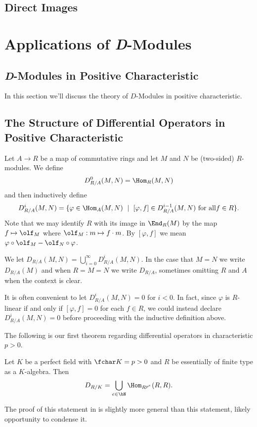 \subsection{Direct Images}

\section{Applications of \textit{D}-Modules}


\subsection{\emph{D}-Modules in Positive Characteristic}
In this section we'll discuss the theory of $D$-Modules in positive characteristic. 
\subsection{The Structure of Differential Operators in Positive Characteristic}

\begin{defn}\label{defn:diff-op-rings}
	Let $A\to R$ be a map of commutative rings and let $M$ and $N$ be (two-sided) $R$-modules. We define
	\begin{align*}
		D^0_{R/A}(M,N) = \Hom_R(M,N)
	\end{align*}
	and then inductively define
	\begin{align*}
		D^i_{R/A}(M,N) = \{\varphi \in \Hom_A(M,N) ~\mid~ [\varphi,f] \in D^{i-1}_{R/A}(M,N) ~ \text{for all} f \in R\}.
	\end{align*}
    Note that we may identify $R$ with its image in $\End_R(M)$ by the map $f \mapsto \olf_M$ where $\olf_M: m\mapsto f\cdot m$. By $[\varphi,f]$ we mean $\varphi\circ \olf_M - \olf_N\circ \varphi$.

	We let $D_{R/A}(M,N) = \bigcup_{i=0}^\infty D^{i}_{R/A}(M,N)$. In the case that $M = N$ we write $D_{R/A}(M)$ and when $R = M = N$ we write $D_{R/A}$, sometimes omitting $R$ and $A$ when the context is clear.
\end{defn}
It is often convenient to let $D^i_{R/A}(M,N) = 0$ for $i < 0$. In fact, since $\varphi$ is $R$-linear if and only if $[\varphi, f] = 0$ for each $f \in R$, we could instead declare $D^i_{R/A}(M,N) = 0$ before proceeding with the inductive definition above.

The following is our first theorem regarding differential operators in characteristic $p > 0$.

\begin{thm}\label{thm:perfect-field-diff-op}
	Let $K$ be a perfect field with $\fchar K = p > 0$ and $R$ be essentially of finite type as a $K$-algebra. Then
	\begin{align*}
		D_{R/K} = \bigcup_{e\in \bN} \Hom_{R^{p^e}}(R,R).
	\end{align*}
\end{thm}
\begin{prf}
	The proof of this statement in \cite{amon92} is slightly more general than this statement, likely opportunity to condense it.
\end{prf}

